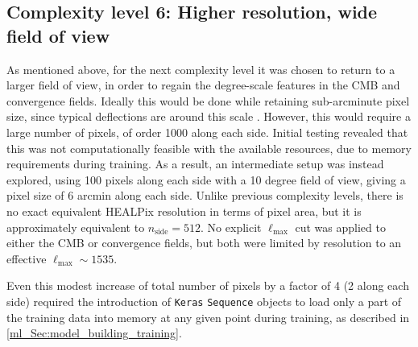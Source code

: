 \subsection{Complexity level 6: Higher resolution, wide field of view}
\label{ml_Sec:v6}

As mentioned above, for the next complexity level it was chosen to return to a larger field of view, in order to regain the degree-scale features in the CMB and convergence fields. Ideally this would be done while retaining sub-arcminute pixel size, since typical deflections are around this scale \citep[e.g.][]{Lewis2006}. However, this would require a large number of pixels, of order 1000 along each side. Initial testing revealed that this was not computationally feasible with the available resources, due to memory requirements during training. As a result, an intermediate setup was instead explored, using 100 pixels along each side with a 10 degree field of view, giving a pixel size of 6 arcmin along each side. Unlike previous complexity levels, there is no exact equivalent HEALPix resolution in terms of pixel area, but it is approximately equivalent to $n_\text{side} = 512$. No explicit $\ell_\text{max}$ cut was applied to either the CMB or convergence fields, but both were limited by resolution to an effective $\ell_\text{max} \sim 1535$.

Even this modest increase of total number of pixels by a factor of 4 (2 along each side) required the introduction of \texttt{Keras} \texttt{Sequence} objects to load only a part of the training data into memory at any given point during training, as described in \autoref{ml_Sec:model_building_training}.

